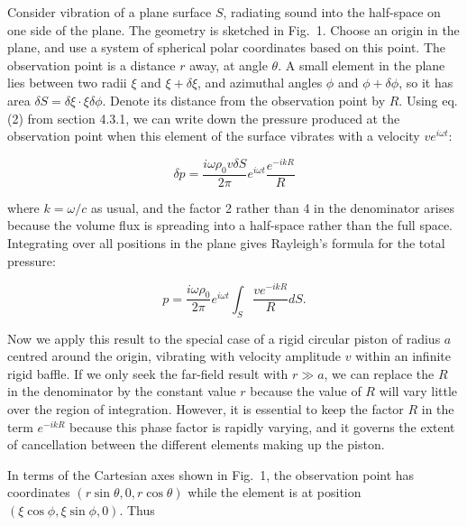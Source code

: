   Consider vibration of a plane surface $S$, radiating sound into the 
  half-space on one side of the plane. The geometry is sketched in Fig.\ 1. 
  Choose an origin in the plane, and use a system of spherical polar 
  coordinates based on this point. The observation point is a distance $r$ 
  away, at angle $\theta$. A small element in the plane lies between two radii 
  $\xi$ and $\xi+\delta \xi$, and azimuthal angles $\phi$ and $\phi + \delta 
  \phi$, so it has area $\delta S= \delta \xi \cdot \xi \delta \phi$. Denote 
  its distance from the observation point by $R$. Using eq. (2) from section 
  4.3.1, we can write down the pressure produced at the observation point when 
  this element of the surface vibrates with a velocity $v e^{i \omega t}$: 

  \begin{equation*}\delta p = \dfrac{i \omega \rho_0 v \delta S}{2 \pi} e^{i 
  \omega t} \dfrac{e^{-i k R}}{R} \tag{1}\end{equation*} 

  \noindent{}where $k=\omega /c$ as usual, and the factor 2 rather than 4 in 
  the denominator arises because the volume flux is spreading into a half-space 
  rather than the full space. Integrating over all positions in the plane gives 
  Rayleigh's formula for the total pressure: 

  \begin{equation*}p = \dfrac{i \omega \rho_0}{2 \pi} e^{i \omega t} 
  \int_S{\dfrac{v e^{-i k R}}{R} dS} . \tag{2}\end{equation*} 


  Now we apply this result to the special case of a rigid circular piston of 
  radius $a$ centred around the origin, vibrating with velocity amplitude $v$ 
  within an infinite rigid baffle. If we only seek the far-field result with $r 
  \gg a$, we can replace the $R$ in the denominator by the constant value $r$ 
  because the value of $R$ will vary little over the region of integration. 
  However, it is essential to keep the factor $R$ in the term $e^{-ikR}$ 
  because this phase factor is rapidly varying, and it governs the extent of 
  cancellation between the different elements making up the piston. 

  In terms of the Cartesian axes shown in Fig.\ 1, the observation point has 
  coordinates $(r \sin \theta, 0, r \cos \theta)$ while the element is at 
  position $(\xi \cos \phi, \xi \sin \phi, 0)$. Thus 

